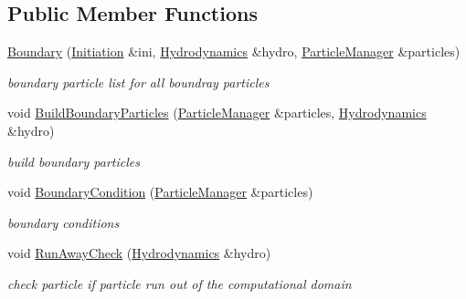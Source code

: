 \subsection*{Public Member Functions}
\begin{CompactItemize}
\item 
\hyperlink{classBoundary_8fe88473063d74e67a5932f2e4d2e517}{Boundary} (\hyperlink{classInitiation}{Initiation} \&ini, \hyperlink{classHydrodynamics}{Hydrodynamics} \&hydro, \hyperlink{classParticleManager}{ParticleManager} \&particles)
\begin{CompactList}\small\item\em boundary particle list for all boundray particles \item\end{CompactList}\item 
void \hyperlink{classBoundary_8a40f99b73f3622cd5f1387fcbbdb824}{BuildBoundaryParticles} (\hyperlink{classParticleManager}{ParticleManager} \&particles, \hyperlink{classHydrodynamics}{Hydrodynamics} \&hydro)
\begin{CompactList}\small\item\em build boundary particles \item\end{CompactList}\item 
void \hyperlink{classBoundary_bedd190ee91482e4e59b2a613ab25d57}{BoundaryCondition} (\hyperlink{classParticleManager}{ParticleManager} \&particles)
\begin{CompactList}\small\item\em boundary conditions \item\end{CompactList}\item 
void \hyperlink{classBoundary_ac37e18aaf60503a66173d9428ed9e54}{RunAwayCheck} (\hyperlink{classHydrodynamics}{Hydrodynamics} \&hydro)
\begin{CompactList}\small\item\em check particle if particle run out of the computational domain \item\end{CompactList}\end{CompactItemize}
